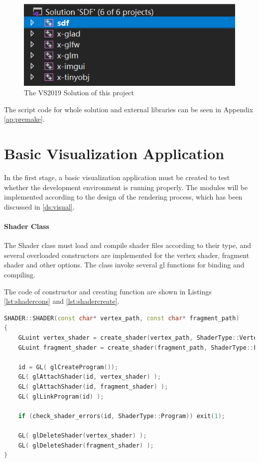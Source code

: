 \clearpage

\begin{figure}[htbp]
    \centering
    \includegraphics[width=12cm]{Images/Chap4/solution.png}
    \caption{The VS2019 Solution of this project}
    \label{impl:solution}
\end{figure}

The script code for whole solution and external libraries can be seen in Appendix \ref{ap:premake}.

\section{Basic Visualization Application}

In the first stage, a basic visualization application must be created to test whether the development environment is running properly. The modules will be implemented according to the design of the rendering process, which has been discussed in \ref{ds:visual}.

\paragraph{Shader Class}

The Shader class must load and compile shader files according to their type, and several overloaded constructors are implemented for the vertex shader, fragment shader and other options. The class invoke several gl functions for binding and compiling.

The code of constructor and creating function are shown in Listings \ref{lst:shadercons} and \ref{lst:shadercreate}.

\begin{lstlisting}[language=C++, label={lst:shadercons}, caption = Constructor of vertex and fragment shader]
    SHADER::SHADER(const char* vertex_path, const char* fragment_path)
{
    GLuint vertex_shader = create_shader(vertex_path, ShaderType::Vertex);
    GLuint fragment_shader = create_shader(fragment_path, ShaderType::Fragment);

    id = GL( glCreateProgram());
    GL( glAttachShader(id, vertex_shader) );
    GL( glAttachShader(id, fragment_shader) );
    GL( glLinkProgram(id) );

    if (check_shader_errors(id, ShaderType::Program)) exit(1);

    GL( glDeleteShader(vertex_shader) );
    GL( glDeleteShader(fragment_shader) );
}
\end{lstlisting}

